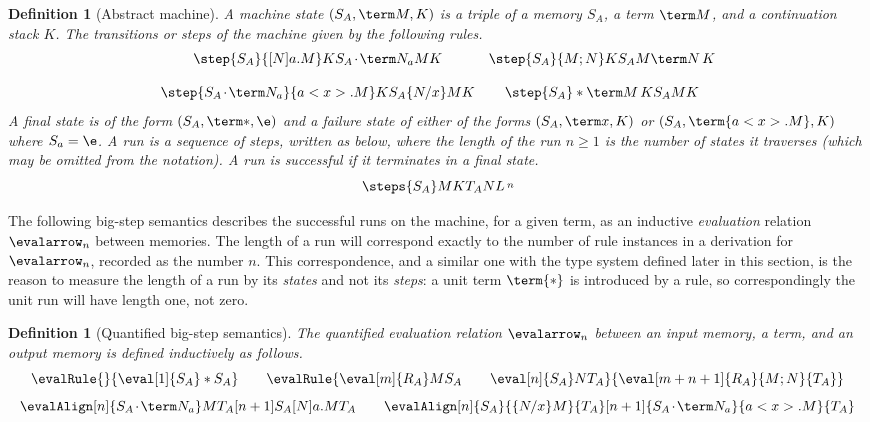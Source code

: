 \documentclass[10pt,a4paper]{amsart}
\newtheorem{definition}[theorem]{Definition}
\newcommand\msep{\kern1pt{\cdot}\kern1pt}
\begin{document}
\begin{definition}[Abstract machine]
A \emph{machine state} $(S_A,\term M,K)$ is a triple of a memory $S_A$, a term $\term M$, and a continuation stack $K$. The \emph{transitions} or \emph{steps} of the machine given by the following rules.
\[
\begin{array}{cc}
	\step {S_A}{[N]a.M}K  {S_A\msep\term N_a} M K		
&   \step {S_A}{M;N}K  {S_A}M{\term N\,K}
\\ \\
	\step {S_A\msep\term N_a}{a<x>.M}K {S_A}{\{N/x\}M}K	
&	\step {S_A}*{\term M\,K} {S_A}MK
\end{array}
\]
A \emph{final state} is of the form $(S_A,\term *,\e)$ and a \emph{failure state} of either of the forms $(S_A,\term x,K)$ or $(S_A,\term{a<x>.M},K)$ where $S_a=\e$. A \emph{run} is a sequence of steps, written as below, where the \emph{length} of the run $n\geq 1$ is the number of states it traverses (which may be omitted from the notation). A run is \emph{successful} if it terminates in a final state.
\[
\steps 
  {S_A} M K 
  {T_A} N L
\,\raisebox{2pt}{$\scriptstyle n$}
\]
\end{definition}

The following big-step semantics describes the successful runs on the machine, for a given term, as an inductive \emph{evaluation} relation $\evalarrow_n$ between memories. The length of a run will correspond exactly to the number of rule instances in a derivation for $\evalarrow_n$, recorded as the number $n$. This correspondence, and a similar one with the type system defined later in this section, is the reason to measure the length of a run by its \emph{states} and not its \emph{steps}: a unit term $\term{*}$ is introduced by a rule, so correspondingly the unit run will have length one, not zero.

\begin{definition}[Quantified big-step semantics]
The quantified \emph{evaluation} relation $\evalarrow_n$ between an input memory, a term, and an output memory is defined inductively as follows.
\[
\evalRule {} {\eval[1]{S_A}*{S_A}}
\qquad
\evalRule {\eval[m]{R_A}M{S_A} \qquad \eval[n]{S_A}N{T_A}} {\eval[m+n+1]{R_A}{M;N}{T_A}}
\]
\[
\evalAlign 
  [n]   {S_A\msep\term N_a}       M  {T_A}
  [n+1] {S_A}               {[N]a.M} {T_A}
\qquad  
\evalAlign 
  [n]   {S_A}             {\{N/x\}M} {T_A}
  [n+1] {S_A\msep\term N_a} {a<x>.M} {T_A}
\]
\end{definition}
\end{document}
